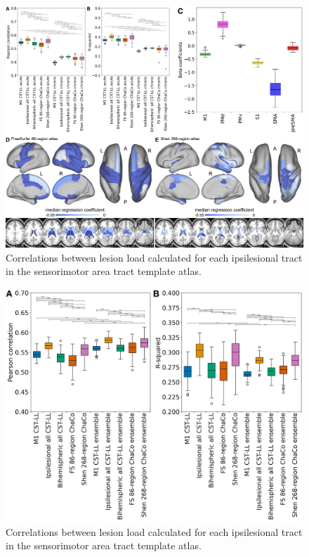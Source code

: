 \documentclass[10pt]{article}
\begin{document}
\begin{figure}[ht]
\centering
\includegraphics[width=0.8\linewidth]{figures/Analysis6.png}
\caption{Correlations between lesion load calculated for each ipsilesional tract in the sensorimotor area tract template atlas.}
\label{smatt_pairwise_correlations}
\end{figure}


\begin{figure}[ht]
\centering
\includegraphics[width=0.8\linewidth]{figures/Analysis7.png}
\caption{Correlations between lesion load calculated for each ipsilesional tract in the sensorimotor area tract template atlas.}
\label{smatt_pairwise_correlations}
\end{figure}
\end{document}
